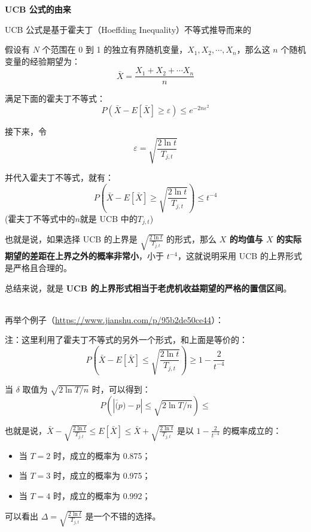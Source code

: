 \documentclass[12pt]{article}
\begin{document}
\begin{framed}
\textbf{UCB 公式的由来\cite{Deep_Learning_Recommender_System}}

UCB 公式是基于霍夫丁（Hoeffding Inequality）不等式推导而来的

假设有 $N$ 个范围在 0 到 1 的独立有界随机变量，$X_1, X_2, \cdots, X_n$，那么这 $n$ 个随机变量的经验期望为：
$$
\bar{X} = \frac{X_1 + X_2 + \cdots X_n}{n}
$$

满足下面的霍夫丁不等式：
$$
P(\bar{X} - E[\bar{X}] \ge \varepsilon) \le e^{-2n\varepsilon^2}
$$

接下来，令 
$$
\varepsilon = \sqrt{\frac{2\ln{t}}{T_{j,t}}}
$$

并代入霍夫丁不等式，就有：
$$
P(\bar{X} - E[\bar{X}] \ge \sqrt{\frac{2\ln{t}}{T_{j,t}}}) \le t^{-4}
$$
(霍夫丁不等式中的$n$就是 UCB 中的$T_{j,t}$)

也就是说，如果选择 UCB 的上界是 $\sqrt{\frac{2\ln{t}}{T_{j,t}}}$ 的形式，那么 \textbf{$X$ 的均值与 $X$ 的实际期望的差距在上界之外的概率非常小}，小于 $t^{-4}$，这就说明采用 UCB 的上界形式是严格且合理的。

总结来说，就是 \textbf{UCB 的上界形式相当于老虎机收益期望的严格的置信区间}。

~\\

再举个例子（\url{https://www.jianshu.com/p/95b2de50ce44}）：

注：这里利用了霍夫丁不等式的另外一个形式，和上面是等价的：
$$
P(\bar{X} - E[\bar{X}] \le \sqrt{\frac{2\ln{t}}{T_{j,t}}}) \ge 1 - \frac{2}{t^{-4}}
$$

当 $\delta$ 取值为 $\sqrt{2\ln T/n}$ 时，可以得到：
$$
P(|\bar(p) - p| \le \sqrt{2\ln T/n} ) \le  
$$

也就是说，$\bar{X} - \sqrt{\frac{2\ln{t}}{T_{j,t}}} \le E[\bar{X}] \le \bar{X} + \sqrt{\frac{2\ln{t}}{T_{j,t}}}$ 是以 $1 - \frac{2}{t^{-4}}$ 的概率成立的：
\begin{itemize}
\setlength{\itemsep}{0pt}
\setlength{\parsep}{0pt}
\setlength{\parskip}{0pt}
    \item 当 $T = 2$ 时，成立的概率为 0.875；
    \item 当 $T = 3$ 时，成立的概率为 0.975；
    \item 当 $T = 4$ 时，成立的概率为 0.992；
\end{itemize}

可以看出 $\Delta = \sqrt{\frac{2\ln{t}}{T_{j,t}}}$ 是一个不错的选择。
\end{framed}
\end{document}
